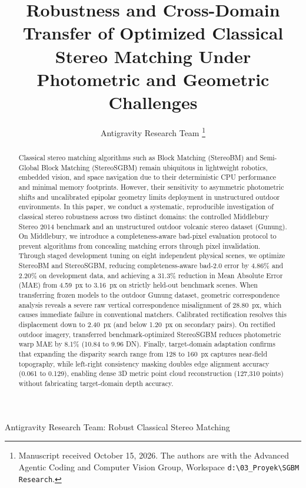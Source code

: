 \documentclass[journal]{IEEEtran}
\begin{document}
\title{Robustness and Cross-Domain Transfer of Optimized Classical Stereo Matching Under Photometric and Geometric Challenges}

\author{Antigravity Research Team%
\thanks{Manuscript received October 15, 2026. The authors are with the Advanced Agentic Coding and Computer Vision Group, Workspace \texttt{d:\textbackslash03\_Proyek\textbackslash SGBM Research}.}}

%
{Antigravity Research Team: Robust Classical Stereo Matching}

\maketitle

\begin{abstract}
Classical stereo matching algorithms such as Block Matching (StereoBM) and Semi-Global Block Matching (StereoSGBM) remain ubiquitous in lightweight robotics, embedded vision, and space navigation due to their deterministic CPU performance and minimal memory footprints. However, their sensitivity to asymmetric photometric shifts and uncalibrated epipolar geometry limits deployment in unstructured outdoor environments. In this paper, we conduct a systematic, reproducible investigation of classical stereo robustness across two distinct domains: the controlled Middlebury Stereo 2014 benchmark and an unstructured outdoor volcanic stereo dataset (Gunung). On Middlebury, we introduce a completeness-aware bad-pixel evaluation protocol to prevent algorithms from concealing matching errors through pixel invalidation. Through staged development tuning on eight independent physical scenes, we optimize StereoBM and StereoSGBM, reducing completeness-aware bad-2.0 error by 4.86\% and 2.20\% on development data, and achieving a 31.3\% reduction in Mean Absolute Error (MAE) from 4.59~px to 3.16~px on strictly held-out benchmark scenes. When transferring frozen models to the outdoor Gunung dataset, geometric correspondence analysis reveals a severe raw vertical correspondence misalignment of 28.80~px, which causes immediate failure in conventional matchers. Calibrated rectification resolves this displacement down to 2.40~px (and below 1.20~px on secondary pairs). On rectified outdoor imagery, transferred benchmark-optimized StereoSGBM reduces photometric warp MAE by 8.1\% (10.84 to 9.96 DN). Finally, target-domain adaptation confirms that expanding the disparity search range from 128 to 160~px captures near-field topography, while left-right consistency masking doubles edge alignment accuracy (0.061 to 0.129), enabling dense 3D metric point cloud reconstruction (127,310 points) without fabricating target-domain depth accuracy.
\end{abstract}
\end{document}
